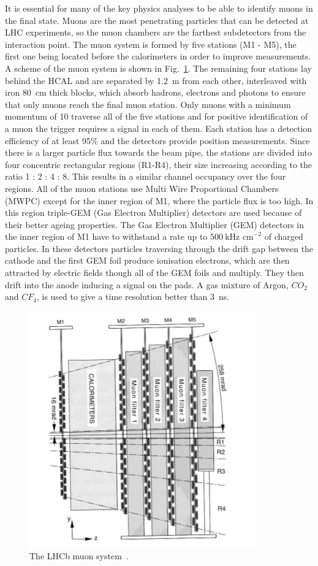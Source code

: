 It is essential for many of the key physics analyses to be able to identify muons in the final state.
Muons are the most penetrating particles that can be detected at LHC experiments, so the muon chambers
are the farthest subdetectors from the interaction point. The muon system is formed by five stations (M1 - M5),
the first one being located before the calorimeters in order to improve \pt measurements. A scheme of the muon
system is shown in Fig.~\ref{muonsystem}. The remaining four stations lay behind the HCAL and are separated by 1.2~m
from each other, interleaved with iron 80~cm thick blocks, which absorb hadrons, electrons and photons to ensure
that only muons reach the final muon station. Only muons with a minimum momentum of 10 \gevc traverse all of the
five stations and for positive identification of a muon the trigger requires a signal in each of them.
Each station has a detection efficiency of at least 95\% and the detectors provide position measurements.
Since there is a larger particle flux towards the beam pipe, the stations are divided
into four concentric rectangular regions (R1-R4), their size increasing according to the ratio 1 : 2 : 4 : 8.
This results in a similar channel occupancy over the four regions. All of the muon stations use
Multi Wire Proportional Chambers (MWPC) except for the inner region of M1, where the particle flux is too high.
In this region triple-GEM (Gas Electron Multiplier) detectors are used because of their better ageing properties.
%
The Gas Electron Multiplier (GEM) detectors in the inner region of M1 have to withstand a rate up to
$500 ~\mbox{kHz cm}^{-2}$ of charged particles. In these detectors particles traversing through the drift gap
between the cathode and the first GEM foil produce ionisation electrons, which are then attracted by electric fields
though all of the GEM foils and multiply. They then drift into the anode inducing a signal on the pads. A gas mixture
of Argon, $CO_2$ and $CF_4$, is used to give a time resolution better than 3~ns.
%
\begin{figure}[h!]
\label{muonsystem}
\centering \includegraphics[width=0.65\linewidth]{Detector/figs/muonsystem.png}
\caption{The LHCb muon system~\cite{Alves:2008zz}.}
\end{figure}



